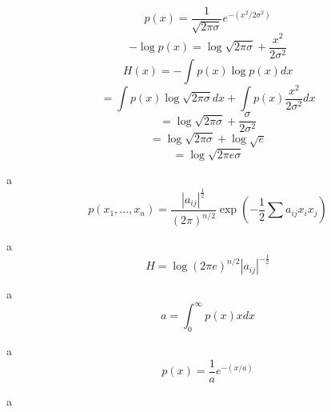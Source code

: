 \begin{equation}
p\left ( x \right )=\frac{1}{\sqrt{2\pi \sigma }}e^{-\left ( x^{2}/2\sigma ^{2} \right )}
\end{equation}
\begin{equation}
-\log p\left ( x \right )=\log \sqrt{2\pi \sigma }+\frac{x^{2}}{2\sigma ^{2}}
\end{equation}
\begin{equation}
H\left ( x \right )=-\int p\left ( x \right )\log p\left ( x \right )dx
\end{equation}
\begin{equation}
=\int p\left ( x \right )\log \sqrt{2\pi \sigma }dx+\int p\left ( x \right )\frac{x^{2}}{2\sigma ^{2}}dx
\end{equation}
\begin{equation}
=\log \sqrt{2\pi \sigma }+\frac{\sigma }{2\sigma ^{2}}
\end{equation}
\begin{equation}
=\log \sqrt{2\pi \sigma }+\log \sqrt{e}
\end{equation}
\begin{equation}
=\log \sqrt{2\pi e \sigma }
\end{equation}

a\\

\begin{equation}
p\left ( x_{1},...,x_{n} \right )=\frac{\left | a_{ij} \right |^{\frac{1}{2}}}{\left ( 2\pi  \right )^{n/2}}\exp \left ( -\frac{1}{2} \sum a_{ij}x_{i}x_{j} \right)
\end{equation}

a\\

\begin{equation}
H=\log \left ( 2\pi e \right )^{n/2}\left | a_{ij} \right |^{-\frac{1}{2}}
\end{equation}

a\\

\begin{equation}
a=\int_{0}^{\infty}p\left ( x \right )xdx
\end{equation}

a\\

\begin{equation}
p\left ( x \right )=\frac{1}{a}e^{-\left ( x/a \right )}
\end{equation}

a\\

